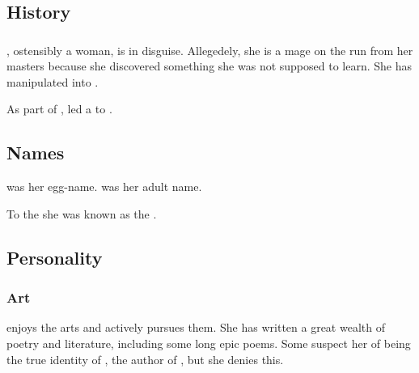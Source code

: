 \subsection{History}





\subsubsection{\Takestsha}
\index{\Takestsha}
\Takestsha, ostensibly a \human{} woman, is \Nzessuacrith{} in disguise. Allegedely, she is a mage on the run from her masters because she discovered something she was not supposed to learn. She has manipulated  into . 

As part of , \Takestsha led a  to .









\subsection{Names}
\Cryocas was her egg-name.
\Nzessuacrith was her adult name. 

To the \Ortaicans she was known as the \taortha {}. 









\subsection{Personality}





\subsubsection{Art}
\Nzessuacrith{} enjoys the arts and actively pursues them. 
She has written a great wealth of poetry and literature, including some long epic poems. 
Some suspect her of being the true identity of , the author of \emph{}, but she denies this. 





